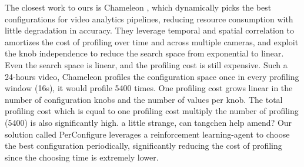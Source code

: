 The closest work to ours is Chameleon \cite{jiang2018chameleon}, which dynamically picks the best configurations for video analytics pipelines, reducing resource consumption
with little degradation in accuracy. They leverage temporal and spatial correlation to amortizes the cost of profiling over time and across multiple cameras, and exploit the knob independence to reduce the search space from exponential to linear. Even the search space is linear, and the profiling cost is still expensive. Such a 24-hours video, Chameleon profiles the configuration space once in every profiling window (16s), it would profile 5400 times. One profiling cost grows linear in the number of configuration knobs and the number of values per knob. The total profiling cost which is equal to one profiling cost multiply the number of profiling (5400) is also significantly high. \textcolor{note}{a little strange, can tangchen help amend?} Our solution called PerConfigure leverages a reinforcement learning-agent to choose the best configuration periodically, significantly reducing the cost of profiling since the choosing time is extremely lower. 